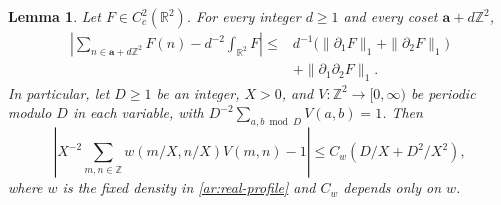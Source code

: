 \documentclass[twoside]{aomart}
\theoremstyle{paperplain}
\newtheorem{lemma}[theorem]{Lemma}
\theoremstyle{paperdefinition}
\newcommand{\Z}{\mathbb Z}
\newcommand{\R}{\mathbb R}
\numberwithin{equation}{section}
\begin{document}
\begin{lemma}
\label{ar:quadrature}
Let $F\in C_c^2(\R^2)$. For every integer $d\ge1$ and every
coset $\mathbf a+d\Z^2$,
\begin{equation}
 \begin{split}
 \left|\sum_{n\in\mathbf a+d\Z^2}F(n)-d^{-2}\int_{\R^2}F\right|
 \le{}&d^{-1}\bigl(\|\partial_1F\|_1+\|\partial_2F\|_1\bigr)\\
 &+\|\partial_1\partial_2F\|_1.
 \end{split}
 \label{ar:residue-quadrature}
\end{equation}
In particular, let $D\ge1$ be an integer, $X>0$, and
$V:\Z^2\to[0,\infty)$ be periodic modulo $D$ in each variable,
with $\displaystyle D^{-2}\sum_{a,b\bmod D}V(a,b)=1$. Then
\begin{equation}
 \left|X^{-2}\sum_{m,n\in\Z}w(m/X,n/X)V(m,n)-1\right|
 \le C_w(D/X+D^2/X^2),
 \label{ar:normalization}
\end{equation}
where $w$ is the fixed density in \eqref{ar:real-profile} and
$C_w$ depends only on $w$.
\end{lemma}
\end{document}
